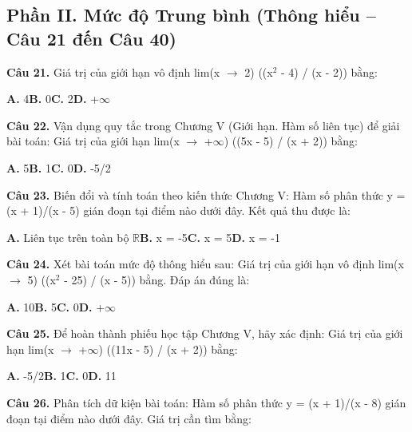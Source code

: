 \documentclass[11pt,a4paper]{article}
\begin{document}
\subsection*{\color{accent} Phần II. Mức độ Trung bình (Thông hiểu -- Câu 21 đến Câu 40)}
\textbf{\color{primary} Câu 21.} Giá trị của giới hạn vô định lim(x $\to$ 2) ((x$^2$ - 4) / (x - 2)) bằng:\par
\hspace*{1.5em}\textbf{A.} 4\quad\quad \textbf{B.} 0\quad\quad \textbf{C.} 2\quad\quad \textbf{D.} +$\infty$\par\vspace{2pt}
\textbf{\color{primary} Câu 22.} Vận dụng quy tắc trong Chương V (Giới hạn. Hàm số liên tục) để giải bài toán: Giá trị của giới hạn lim(x $\to$ +$\infty$) ((5x - 5) / (x + 2)) bằng:\par
\hspace*{1.5em}\textbf{A.} 5\quad\quad \textbf{B.} 1\quad\quad \textbf{C.} 0\quad\quad \textbf{D.} -5/2\par\vspace{2pt}
\textbf{\color{primary} Câu 23.} Biến đổi và tính toán theo kiến thức Chương V: Hàm số phân thức y = (x + 1)/(x - 5) gián đoạn tại điểm nào dưới đây. Kết quả thu được là:\par
\hspace*{1.5em}\textbf{A.} Liên tục trên toàn bộ $\mathbb{R}$\quad\quad \textbf{B.} x = -5\quad\quad \textbf{C.} x = 5\quad\quad \textbf{D.} x = -1\par\vspace{2pt}
\textbf{\color{primary} Câu 24.} Xét bài toán mức độ thông hiểu sau: Giá trị của giới hạn vô định lim(x $\to$ 5) ((x$^2$ - 25) / (x - 5)) bằng. Đáp án đúng là:\par
\hspace*{1.5em}\textbf{A.} 10\quad\quad \textbf{B.} 5\quad\quad \textbf{C.} 0\quad\quad \textbf{D.} +$\infty$\par\vspace{2pt}
\textbf{\color{primary} Câu 25.} Để hoàn thành phiếu học tập Chương V, hãy xác định: Giá trị của giới hạn lim(x $\to$ +$\infty$) ((11x - 5) / (x + 2)) bằng:\par
\hspace*{1.5em}\textbf{A.} -5/2\quad\quad \textbf{B.} 1\quad\quad \textbf{C.} 0\quad\quad \textbf{D.} 11\par\vspace{2pt}
\textbf{\color{primary} Câu 26.} Phân tích dữ kiện bài toán: Hàm số phân thức y = (x + 1)/(x - 8) gián đoạn tại điểm nào dưới đây. Giá trị cần tìm bằng:\par
\end{document}
